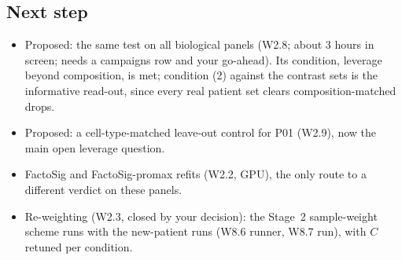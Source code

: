 \subsection*{Next step}
\begin{itemize}
\item Proposed: the same test on all biological panels (W2.8; about 3 hours in screen; needs a campaigns row and your go-ahead). Its condition, leverage beyond composition, is met; condition (2) against the contrast sets is the informative read-out, since every real patient set clears composition-matched drops.
\item Proposed: a cell-type-matched leave-out control for P01 (W2.9), now the main open leverage question.
\item FactoSig and FactoSig-promax refits (W2.2, GPU), the only route to a different verdict on these panels.
\item Re-weighting (W2.3, closed by your decision): the Stage~2 sample-weight scheme runs with the new-patient runs (W8.6 runner, W8.7 run), with $C$ retuned per condition.
\end{itemize}

